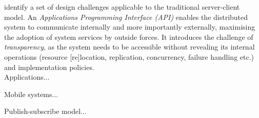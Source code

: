 \documentclass[../report.tex]{subfiles}
\begin{document}
\cite{kshemkalyani2011distributed} identify a set of design challenges applicable to the traditional server-client model. An \textit{Applications Programming Interface (API)} enables the distributed system to communicate internally and more importantly externally, maximising the adoption of system services by outside forces. It introduces the challenge of \textit{transparency}, as the system needs to be accessible without revealing its internal operations (resource [re]location, replication, concurrency, failure handling etc.) and implementation policies. \\

Applications...

Mobile systems...

Publish-subscribe model...





\end{document}
